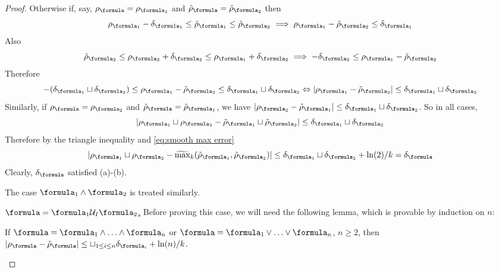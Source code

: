 \begin{proof}
Otherwise if, say, $\robf = \rob_{\formula_1}$ and $\srobf = \srob_{\formula_2}$ then
\[\robfa -\delta_{\formula_1} \leq \srob_{\formula_1} \leq \srob_{\formula_2} \implies \robfa-\srob_{\formula_2} \leq \delta_{\formula_1}\]
Also 
\[\srob_{\formula_2} \leq \robfb+\delta_{\formula_2} \leq \robfa + \delta_{\formula_2} \implies -\delta_{\formula_2} \leq \robfa - \srob_{\formula_2}\]
Therefore
\begin{equation*}
\label{eq:inter}
-(\delta_{\formula_1} \sqcup \delta_{\formula_2})\leq \robfa - \srob_{\formula_2}\leq \delta_{\formula_1} \sqcup \delta_{\formula_2} \Leftrightarrow |\robfa - \srob_{\formula_2}|\leq \delta_{\formula_1} \sqcup \delta_{\formula_2}
\end{equation*}
Similarly, if $\robf = \rob_{\formula_2}$ and $\srobf = \srob_{\formula_1}$, we have $|\robfb - \srob_{\formula_1}|\leq  \delta_{\formula_1} \sqcup \delta_{\formula_2}$.
So in all cases, 
\[|\robfa \sqcup \robfb - \srob_{\formula_1} \sqcup \srob_{\formula_2}|\leq \delta_{\formula_1} \sqcup \delta_{\formula_2}\]
Therefore by the triangle inequality and \eqref{eq:smooth max error}
\[|\robfa \sqcup \robfb - \smax_k(\srob_{\formula_1} , \srob_{\formula_2})|\leq  \delta_{\formula_1} \sqcup \delta_{\formula_2} + \ln(2)/k  = \delta_\formula\]
Clearly, $\delta_\formula$ satisfied (a)-(b).

The case $\formula_1 \land \formula_2$ is treated similarly.

\underline{$\formula = \formula_1 \until_I \formula_2$.} 
Before proving this case, we will need the following lemma, which is provable by induction on $n$:
\begin{lemma}
	\label{lemma:n-ary apx}
	If $\formula = \formula_1\land \ldots\land \formula_n$ or $\formula = \formula_1\lor \ldots\lor \formula_n$, $n\geq 2$, then 
	$|\robf - \srobf| \leq \sqcup_{1\leq i \leq n}\delta_{\formula_i} + \ln(n)/k$.
\end{lemma}


\end{proof}
